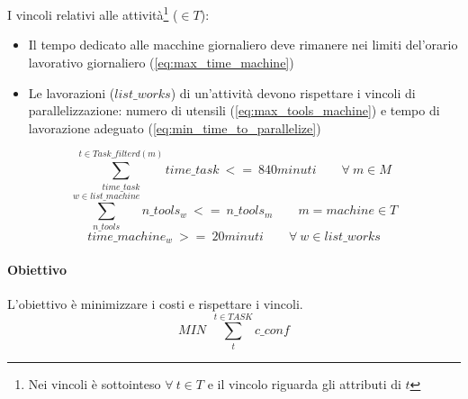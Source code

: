 \\\\
I vincoli relativi alle attività\footnote{Nei vincoli è sottointeso \(\forall\ t \in T\) e il vincolo riguarda gli attributi di \(t\)} (\(\in T\)):
\begin{itemize}
    \item Il tempo dedicato alle macchine giornaliero deve rimanere nei limiti del'orario lavorativo giornaliero (\ref{eq:max_time_machine})
    \item Le lavorazioni (\(list\_works\)) di un'attività devono rispettare i vincoli di parallelizzazione: numero di utensili (\ref{eq:max_tools_machine}) e tempo di lavorazione adeguato (\ref{eq:min_time_to_parallelize})
\end{itemize}
\begin{equation} \label{eq:max_time_machine}
    \sum_{time\_task}^{t \in Task\_filterd(m)}time\_task \ <=\ 840 minuti \qquad  \forall\ m \in M
\end{equation}
\begin{equation} \label{eq:max_tools_machine}
    \sum_{n\_tools}^{w \in list\_machine}n\_tools_w \ <=\ n\_tools_m \qquad  m = machine \in T 
\end{equation}
\begin{equation} \label{eq:min_time_to_parallelize}
    time\_machine_w \ >=\ 20 minuti \qquad  \forall\ w \in list\_works 
\end{equation}

\paragraph{Obiettivo}
L'obiettivo è minimizzare i costi e rispettare i vincoli.
\begin{equation} \label{eq:obj}
    MIN\ \ \sum_{t}^{t \in TASK} c\_conf
\end{equation}

